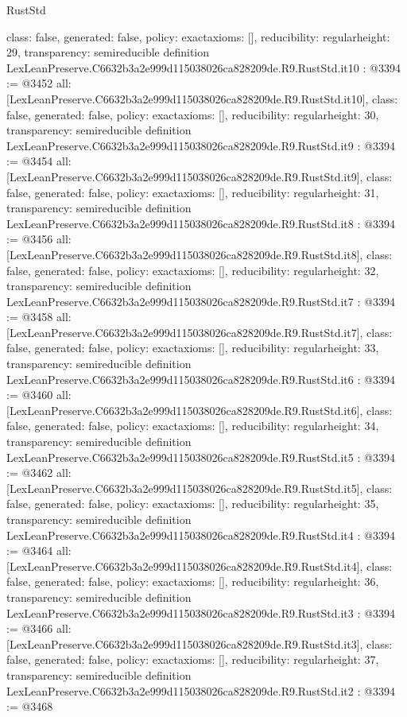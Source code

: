 \begin{lexlean}{RustStd}
\begin{coremodule}
{  class: false,
  generated: false,
  policy: exact{axioms: []},
  reducibility: regular{height: 29},
  transparency: semireducible
}
definition LexLeanPreserve.C6632b3a2e999d115038026ca828209de.R9.RustStd.it10 : @3394 := @3452 {
  all: [LexLeanPreserve.C6632b3a2e999d115038026ca828209de.R9.RustStd.it10],
  class: false,
  generated: false,
  policy: exact{axioms: []},
  reducibility: regular{height: 30},
  transparency: semireducible
}
definition LexLeanPreserve.C6632b3a2e999d115038026ca828209de.R9.RustStd.it9 : @3394 := @3454 {
  all: [LexLeanPreserve.C6632b3a2e999d115038026ca828209de.R9.RustStd.it9],
  class: false,
  generated: false,
  policy: exact{axioms: []},
  reducibility: regular{height: 31},
  transparency: semireducible
}
definition LexLeanPreserve.C6632b3a2e999d115038026ca828209de.R9.RustStd.it8 : @3394 := @3456 {
  all: [LexLeanPreserve.C6632b3a2e999d115038026ca828209de.R9.RustStd.it8],
  class: false,
  generated: false,
  policy: exact{axioms: []},
  reducibility: regular{height: 32},
  transparency: semireducible
}
definition LexLeanPreserve.C6632b3a2e999d115038026ca828209de.R9.RustStd.it7 : @3394 := @3458 {
  all: [LexLeanPreserve.C6632b3a2e999d115038026ca828209de.R9.RustStd.it7],
  class: false,
  generated: false,
  policy: exact{axioms: []},
  reducibility: regular{height: 33},
  transparency: semireducible
}
definition LexLeanPreserve.C6632b3a2e999d115038026ca828209de.R9.RustStd.it6 : @3394 := @3460 {
  all: [LexLeanPreserve.C6632b3a2e999d115038026ca828209de.R9.RustStd.it6],
  class: false,
  generated: false,
  policy: exact{axioms: []},
  reducibility: regular{height: 34},
  transparency: semireducible
}
definition LexLeanPreserve.C6632b3a2e999d115038026ca828209de.R9.RustStd.it5 : @3394 := @3462 {
  all: [LexLeanPreserve.C6632b3a2e999d115038026ca828209de.R9.RustStd.it5],
  class: false,
  generated: false,
  policy: exact{axioms: []},
  reducibility: regular{height: 35},
  transparency: semireducible
}
definition LexLeanPreserve.C6632b3a2e999d115038026ca828209de.R9.RustStd.it4 : @3394 := @3464 {
  all: [LexLeanPreserve.C6632b3a2e999d115038026ca828209de.R9.RustStd.it4],
  class: false,
  generated: false,
  policy: exact{axioms: []},
  reducibility: regular{height: 36},
  transparency: semireducible
}
definition LexLeanPreserve.C6632b3a2e999d115038026ca828209de.R9.RustStd.it3 : @3394 := @3466 {
  all: [LexLeanPreserve.C6632b3a2e999d115038026ca828209de.R9.RustStd.it3],
  class: false,
  generated: false,
  policy: exact{axioms: []},
  reducibility: regular{height: 37},
  transparency: semireducible
}
definition LexLeanPreserve.C6632b3a2e999d115038026ca828209de.R9.RustStd.it2 : @3394 := @3468 {
}
\end{coremodule}
\end{lexlean}
